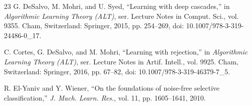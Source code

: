 \documentclass[12pt]{article}
\begin{document}
\begin{thebibliography}{23}
 G. DeSalvo, M. Mohri, and U. Syed, ``Learning with deep cascades,'' in \textit{Algorithmic Learning Theory (ALT)}, ser. Lecture Notes in Comput. Sci., vol. 9355. Cham, Switzerland: Springer, 2015, pp. 254--269, doi: 10.1007/978-3-319-24486-0\_17.

 C. Cortes, G. DeSalvo, and M. Mohri, ``Learning with rejection,'' in \textit{Algorithmic Learning Theory (ALT)}, ser. Lecture Notes in Artif. Intell., vol. 9925. Cham, Switzerland: Springer, 2016, pp. 67--82, doi: 10.1007/978-3-319-46379-7\_5.

 R. El-Yaniv and Y. Wiener, ``On the foundations of noise-free selective classification,'' \textit{J. Mach. Learn. Res.}, vol. 11, pp. 1605--1641, 2010.

\end{thebibliography}
\thispagestyle{empty}
\end{document}
